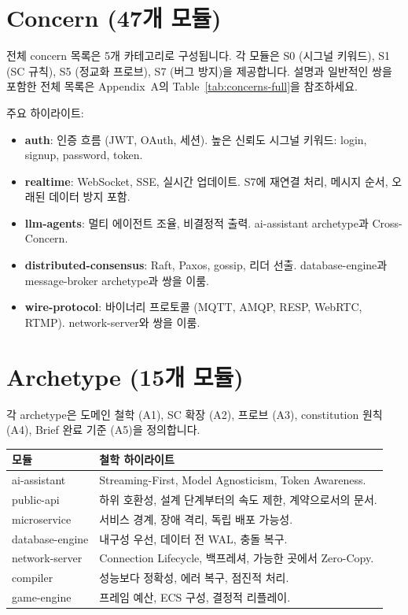 \documentclass[11pt,a4paper,openright,twoside]{report}
\begin{document}
\section{Concern (47개 모듈)}

전체 concern 목록은 5개 카테고리로 구성됩니다. 각 모듈은 S0 (시그널 키워드), S1 (SC 규칙), S5 (정교화 프로브), S7 (버그 방지)을 제공합니다. 설명과 일반적인 쌍을 포함한 전체 목록은 Appendix~A의 Table~\ref{tab:concerns-full}을 참조하세요.

주요 하이라이트:

\begin{itemize}
  \item \textbf{auth}: 인증 흐름 (JWT, OAuth, 세션). 높은 신뢰도 시그널 키워드: login, signup, password, token.
  \item \textbf{realtime}: WebSocket, SSE, 실시간 업데이트. S7에 재연결 처리, 메시지 순서, 오래된 데이터 방지 포함.
  \item \textbf{llm-agents}: 멀티 에이전트 조율, 비결정적 출력. ai-assistant archetype과 Cross-Concern.
  \item \textbf{distributed-consensus}: Raft, Paxos, gossip, 리더 선출. database-engine과 message-broker archetype과 쌍을 이룸.
  \item \textbf{wire-protocol}: 바이너리 프로토콜 (MQTT, AMQP, RESP, WebRTC, RTMP). network-server와 쌍을 이룸.
\end{itemize}

\section{Archetype (15개 모듈)}

각 archetype은 도메인 철학 (A1), SC 확장 (A2), 프로브 (A3), constitution 원칙 (A4), Brief 완료 기준 (A5)을 정의합니다.

\begin{longtable}{lp{8cm}}
\toprule
\textbf{모듈} & \textbf{철학 하이라이트} \\
\midrule
\endhead
ai-assistant & Streaming-First, Model Agnosticism, Token Awareness. \\
public-api & 하위 호환성, 설계 단계부터의 속도 제한, 계약으로서의 문서. \\
microservice & 서비스 경계, 장애 격리, 독립 배포 가능성. \\
database-engine & 내구성 우선, 데이터 전 WAL, 충돌 복구. \\
network-server & Connection Lifecycle, 백프레셔, 가능한 곳에서 Zero-Copy. \\
compiler & 성능보다 정확성, 에러 복구, 점진적 처리. \\
game-engine & 프레임 예산, ECS 구성, 결정적 리플레이. \\
\bottomrule
\end{longtable}
\end{document}

